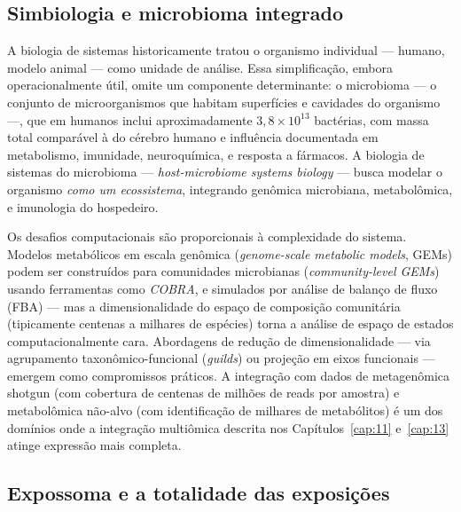 \subsection{Simbiologia e microbioma integrado}
\label{sec:15-microbioma}

A biologia de sistemas historicamente tratou o organismo individual --- humano, modelo animal --- como unidade de análise. Essa simplificação, embora operacionalmente útil, omite um componente determinante: o microbioma --- o conjunto de microorganismos que habitam superfícies e cavidades do organismo ---, que em humanos inclui aproximadamente $3{,}8 \times 10^{13}$ bactérias, com massa total comparável à do cérebro humano e influência documentada em metabolismo, imunidade, neuroquímica, e resposta a fármacos. A biologia de sistemas do microbioma --- \emph{host-microbiome systems biology} --- busca modelar o organismo \emph{como um ecossistema}, integrando genômica microbiana, metabolômica, e imunologia do hospedeiro.

Os desafios computacionais são proporcionais à complexidade do sistema. Modelos metabólicos em escala genômica (\emph{genome-scale metabolic models}, GEMs) podem ser construídos para comunidades microbianas (\emph{community-level GEMs}) usando ferramentas como \emph{COBRA}, e simulados por análise de balanço de fluxo (FBA) --- mas a dimensionalidade do espaço de composição comunitária (tipicamente centenas a milhares de espécies) torna a análise de espaço de estados computacionalmente cara. Abordagens de redução de dimensionalidade --- via agrupamento taxonômico-funcional (\emph{guilds}) ou projeção em eixos funcionais --- emergem como compromissos práticos. A integração com dados de metagenômica shotgun (com cobertura de centenas de milhões de reads por amostra) e metabolômica não-alvo (com identificação de milhares de metabólitos) é um dos domínios onde a integração multiômica descrita nos Capítulos~\ref{cap:11} e~\ref{cap:13} atinge expressão mais completa.


\subsection{Expossoma e a totalidade das exposições}
\label{sec:15-expossoma}

